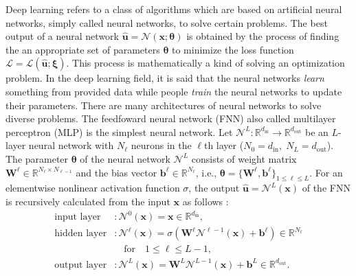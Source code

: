 Deep learning refers to a class of algorithms which are based on artificial neural networks, simply called neural networks, to solve certain problems. The best output of a neural network $\boldsymbol{\hat{u}} = \mathcal{N}(\boldsymbol{x}; \boldsymbol{\theta})$ is obtained by the process of finding the an appropriate set of parameters $\boldsymbol{\theta}$ to minimize the loss function $\mathcal{L} = \mathcal{L}(\boldsymbol{\hat{u}}; \boldsymbol{\xi})$. This process is mathematically a kind of solving an optimization problem. In the deep learning field, it is said that the neural networks \emph{learn} something from provided data while people \emph{train} the neural networks to update their parameters. There are many architectures of neural networks to solve diverse problems. The feedfoward neural network (FNN) also called multilayer perceptron (MLP) is the simplest neural network. Let $\mathcal{N}^{L}\colon \mathbb{R}^{d_\text{in}} \to \mathbb{R}^{d_\text{out}}$ be an $L$-layer neural network with $N_{\ell}$ neurons in the $\ell$th layer ($N_0 = d_{\text{in}}, \; N_{L} = d_{\text{out}}$). The parameter $\boldsymbol{\theta}$ of the neural network $\mathcal{N}^{L}$ consists of weight matrix $\boldsymbol{W}^{\ell} \in \mathbb{R}^{N_{\ell}\times N_{\ell-1}}$ and the bias vector $\mathbf{b}^{\ell} \in \mathbb{R}^{N_{\ell}}$, i.e., $\boldsymbol{\theta} = \{ \boldsymbol{W}^{\ell}, \mathbf{b}^{\ell}\}_{1 \le \ell \le L}$. For an elementwise nonlinear activation function $\sigma$, the output $\boldsymbol{\hat{u}} = \mathcal{N}^{L}(\boldsymbol{x})$ of the FNN is recursively calculated from the input $\boldsymbol{x}$ as follows \parencite{lu2021deepxde}:
\begin{align*}
\text{input layer} &: \mathcal{N}^{0}(\boldsymbol{x}) = \boldsymbol{x} \in \mathbb{R}^{d_{\text{in}}}, \\
\text{hidden layer} &: \mathcal{N}^{\ell}(\boldsymbol{x}) = \sigma(\boldsymbol{W}^{\ell}\mathcal{N}^{\ell-1}(\boldsymbol{x}) + \mathbf{b}^{\ell}) \in \mathbb{R}^{N_{\ell}} \\ & \quad \text{for} \quad 1 \le \ell \le L-1, \\
\text{output layer} &: \mathcal{N}^{L}(\boldsymbol{x}) = \boldsymbol{W}^{L} \mathcal{N}^{L-1}(\boldsymbol{x}) + \mathbf{b}^{L} \in \mathbb{R}^{d_{\text{out}}}.
\end{align*}

